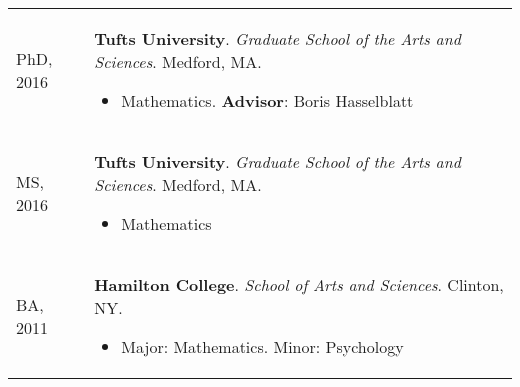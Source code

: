 
    \medskip


    \medskip
    
    \begin{center}
    {
    \renewcommand{\arraystretch}{1.5}
    \begin{longtable}{p{}  p{}}
    PhD, 2016 & \textbf{Tufts University}. \textit{Graduate School of the Arts and Sciences}.  Medford, MA. 
        \hspace{-1em}

        {\small
        \begin{itemize}
        \setlength{\parindent}{0em}
        \item[] Mathematics. \textbf{ Advisor}: Boris Hasselblatt
        \end{itemize}
        }
        \vspace{-1em}
         \\ 
MS, 2016 & \textbf{Tufts University}. \textit{Graduate School of the Arts and Sciences}.  Medford, MA. 
        \hspace{-1em}

        {\small
        \begin{itemize}
        \setlength{\parindent}{0em}
        \item[] Mathematics
        \end{itemize}
        }
        \vspace{-1em}
         \\ 
BA, 2011 & \textbf{Hamilton College}. \textit{School of Arts and Sciences}.  Clinton, NY. 
        \hspace{-1em}

        {\small
        \begin{itemize}
        \setlength{\parindent}{0em}
        \item[] Major: Mathematics. Minor: Psychology
        \end{itemize}
        }
        \vspace{-1em}
         
    \end{longtable}
    } 
    \end{center}

    \vspace{-1em}
    